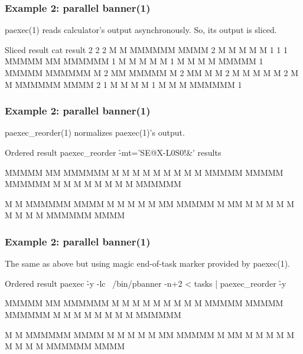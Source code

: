 \documentclass[hyperref={colorlinks=true}]{beamer}
\begin{document}
\linespread{0.5}
\begin{frame}[fragile]
  \frametitle{Example 2: parallel banner(1)}
paexec(1) reads calculator's output asynchronously.
So, its output is sliced.
  \begin{block}{}
      \begin{CodeSmall}{Sliced result}
\prompt{\$} cat result
2 
2 
2  M    M  MMMMMM   MMMM
2   M  M   M       M    M
1 
1 
1  MMMMM     MM    MMMMMM
1  M    M   M  M   M
1  M    M  M    M  MMMMM
1  MMMMM   MMMMMM  M
2    MM    MMMMM   M
2    MM    M       M
2   M  M   M       M    M
2  M    M  MMMMMM   MMMM
2 
1  M       M    M  M
1  M       M    M  MMMMMM
1 
\prompt{\$}
      \end{CodeSmall}
  \end{block}
\end{frame}
\linespread{1}

\linespread{0.5}
\begin{frame}[fragile]
  \frametitle{Example 2: parallel banner(1)}
paexec\_reorder(1) normalizes paexec(1)'s output.
  \begin{block}{}
      \begin{CodeSmall}{Ordered result}
\prompt{\$} paexec_reorder \h{-mt='SE@X-L0S0!&'} results


MMMMM     MM    MMMMMM
M    M   M  M   M
M    M  M    M  MMMMM
MMMMM   MMMMMM  M
M       M    M  M
M       M    M  MMMMMM



M    M  MMMMMM   MMMM
 M  M   M       M    M
  MM    MMMMM   M
  MM    M       M
 M  M   M       M    M
M    M  MMMMMM   MMMM


\prompt{\$}
      \end{CodeSmall}
  \end{block}
\end{frame}
\linespread{1}

\linespread{0.5}
\begin{frame}[fragile]
  \frametitle{Example 2: parallel banner(1)}
The same as above but using magic end-of-task marker provided by paexec(1).
  \begin{block}{}
      \begin{CodeSmall}{Ordered result}
\prompt{\$} paexec \h{-y} -lc ~/bin/pbanner -n+2 < tasks | paexec_reorder \h{-y}


MMMMM     MM    MMMMMM
M    M   M  M   M
M    M  M    M  MMMMM
MMMMM   MMMMMM  M
M       M    M  M
M       M    M  MMMMMM



M    M  MMMMMM   MMMM
 M  M   M       M    M
  MM    MMMMM   M
  MM    M       M
 M  M   M       M    M
M    M  MMMMMM   MMMM


\prompt{\$}
      \end{CodeSmall}
  \end{block}
\end{frame}
\linespread{1}
\end{document}

